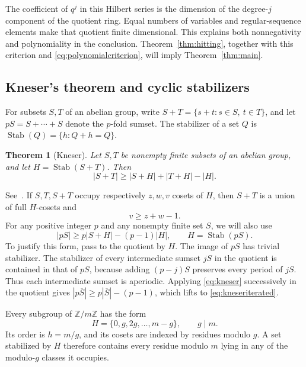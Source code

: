 \documentclass[11pt,a4paper]{article}
\numberwithin{equation}{section}
\newtheorem{theorem}{Theorem}[section]
\theoremstyle{remark}
\newcommand{\Z}{\mathbb Z}
\DeclareMathOperator{\Stab}{Stab}
\begin{document}
The coefficient of $q^j$ in this Hilbert series is the dimension of
the degree-$j$ component of the quotient ring. Equal numbers of variables
and regular-sequence elements make that quotient finite dimensional.
This explains both nonnegativity and polynomiality in the conclusion.
Theorem~\ref{thm:hitting}, together with this criterion and
\eqref{eq:polynomialcriterion}, will imply Theorem~\ref{thm:main}.

\subsection{Kneser's theorem and cyclic stabilizers}

For subsets $S,T$ of an abelian group, write
$S+T=\{s+t:s\in S,\ t\in T\}$, and let
$pS=S+\cdots+S$ denote the $p$-fold sumset. The stabilizer of a set $Q$
is $\Stab(Q)=\{h:Q+h=Q\}$.

\begin{theorem}[Kneser]\label{thm:kneser}
Let $S,T$ be nonempty finite subsets of an abelian group, and let
$H=\Stab(S+T)$. Then
\begin{equation}\label{eq:kneser}
  |S+T|\ge |S+H|+|T+H|-|H|.
\end{equation}
\end{theorem}

See~\cite[Theorem~1]{DeVos}. If $S,T,S+T$ occupy respectively $z,w,v$
cosets of $H$, then $S+T$ is a union of full $H$-cosets and
\begin{equation}\label{eq:knesercosets}
  v\ge z+w-1.
\end{equation}
For any positive integer $p$ and any nonempty finite set $S$, we will also use
\begin{equation}\label{eq:kneseriterated}
  |pS|\ge p|S+H|-(p-1)|H|,
  \qquad H=\Stab(pS).
\end{equation}
To justify this form, pass to the quotient by $H$.
The image of $pS$ has trivial stabilizer. The stabilizer of every
intermediate sumset $jS$ in the quotient is contained in that of $pS$,
because adding $(p-j)S$ preserves every period of $jS$.
Thus each intermediate sumset is aperiodic. Applying
\eqref{eq:kneser} successively in the quotient gives
$|p\overline S|\ge p|\overline S|-(p-1)$, which lifts to
\eqref{eq:kneseriterated}.

Every subgroup of $\Z/m\Z$ has the form
\begin{equation}\label{eq:cyclicsubgroup}
  H=\{0,g,2g,\ldots,m-g\},\qquad g\mid m.
\end{equation}
Its order is $h=m/g$, and its cosets are indexed by residues modulo $g$.
A set stabilized by $H$ therefore contains every residue modulo $m$
lying in any of the modulo-$g$ classes it occupies.
\end{document}
